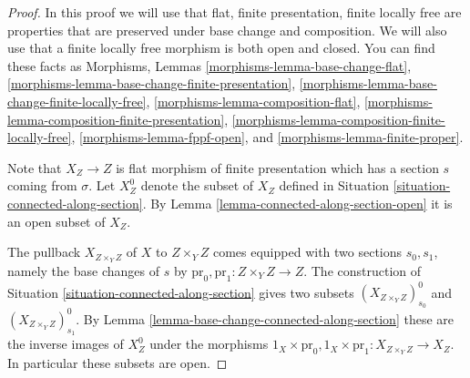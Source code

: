 \documentclass[10pt,a4paper]{amsart}
\theoremstyle{plain}
\theoremstyle{definition}
\theoremstyle{remark}
\numberwithin{equation}{subsection}
\begin{document}
\begin{proof}
In this proof we will use that flat, finite presentation, finite locally
free are properties that are preserved under base change and composition.
We will also use that a finite locally free morphism is both open and
closed. You can find these facts as
Morphisms, Lemmas
\ref{morphisms-lemma-base-change-flat},
\ref{morphisms-lemma-base-change-finite-presentation},
\ref{morphisms-lemma-base-change-finite-locally-free},
\ref{morphisms-lemma-composition-flat},
\ref{morphisms-lemma-composition-finite-presentation},
\ref{morphisms-lemma-composition-finite-locally-free},
\ref{morphisms-lemma-fppf-open}, and
\ref{morphisms-lemma-finite-proper}.

\medskip\noindent
Note that $X_Z \to Z$ is flat morphism of finite presentation
which has a section $s$ coming from $\sigma$. Let $X_Z^0$ denote
the subset of $X_Z$ defined in
Situation \ref{situation-connected-along-section}.
By
Lemma \ref{lemma-connected-along-section-open}
it is an open subset of $X_Z$.

\medskip\noindent
The pullback $X_{Z \times_Y Z}$ of $X$ to $Z \times_Y Z$ comes equipped
with two sections $s_0, s_1$, namely the base changes of $s$ by
$\text{pr}_0, \text{pr}_1 : Z \times_Y Z \to Z$. The construction of
Situation \ref{situation-connected-along-section}
gives two subsets $(X_{Z \times_Y Z})_{s_0}^0$ and
$(X_{Z \times_Y Z})_{s_1}^0$. By
Lemma \ref{lemma-base-change-connected-along-section}
these are the inverse images of $X_Z^0$ under the morphisms
$1_X \times \text{pr}_0, 1_X \times \text{pr}_1 : X_{Z \times_Y Z} \to X_Z$.
In particular these subsets are open.


\end{proof}
\end{document}
